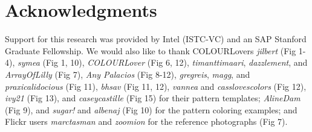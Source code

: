 \section*{Acknowledgments}

Support for this research was provided by Intel (ISTC-VC) and an SAP Stanford Graduate Fellowship.
We would also like to thank COLOURLovers \textit{jilbert} (Fig 1-4), \textit{symea} (Fig 1, 10), \textit{COLOURLover} (Fig 6, 12), \textit{timanttimaari}, \textit{dazzlement}, and \textit{ArrayOfLilly} (Fig 7), \textit{Any Palacios} (Fig 8-12), \textit{gregreis}, \textit{magg}, and \textit{praxicalidocious} (Fig 11), \textit{bhsav} (Fig 11, 12), \textit{vannea} and \textit{casslovescolors} (Fig 12), \textit{ivy21} (Fig 13), and \textit{caseycastille} (Fig 15) for their pattern templates; \textit{AlineDam} (Fig 9), and \textit{sugar!} and \textit{albenaj} (Fig 10) for the pattern coloring examples; and Flickr users \textit{marctasman} and \textit{zoomion} for the reference photographs (Fig 7).   
